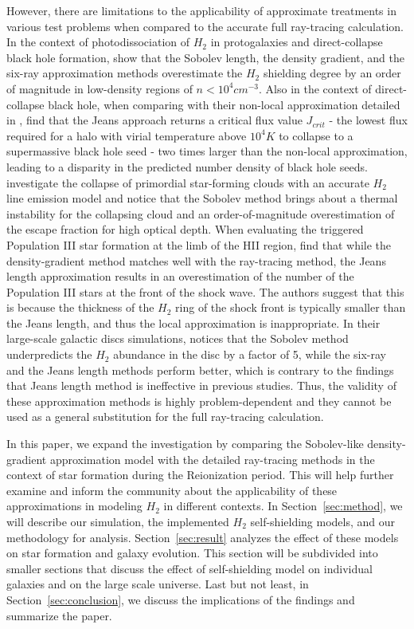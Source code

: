 \documentclass[linenumbers, twocolumn]{aastex631}
\begin{document}
However, there are limitations to the applicability of approximate treatments in various test problems when compared to the accurate full ray-tracing calculation. In the context of photodissociation of $H_{2}$ in protogalaxies and direct-collapse black hole formation, \cite{Wolcott-Green+2011} show that the Sobolev length, the density gradient, and the six-ray approximation methods overestimate the $H_{2}$ shielding degree by an order of magnitude in low-density regions of $n < 10^{4} cm^{-3}$. Also in the context of direct-collapse black hole, when comparing with their non-local approximation detailed in \cite{Hartwig+2015}, \cite{Hartwig+2015b} find that the Jeans approach returns a critical flux value $J_{crit}$ - the lowest flux required for a halo with virial temperature above $10^{4} K$ to collapse to a supermassive black hole seed - two times larger than the non-local approximation, leading to a disparity in the predicted number density of black hole seeds. \cite{Greif+2014} investigate the collapse of primordial star-forming clouds with an accurate $H_{2}$ line emission model and notice that the Sobolev method brings about a thermal instability for the collapsing cloud and an order-of-magnitude overestimation of the escape fraction for high optical depth. When evaluating the triggered Population III star formation at the limb of the HII region, \cite{Chiaki+2023a} find that while the density-gradient method matches well with the ray-tracing method, the Jeans length approximation results in an overestimation of the number of the Population III stars at the front of the shock wave. The authors suggest that this is because the thickness of the $H_{2}$ ring of the shock front is typically smaller than the Jeans length, and thus the local approximation is inappropriate. In their large-scale galactic discs simulations, \cite{Safranek-Shrader+2017} notices that the Sobolev method underpredicts the $H_{2}$ abundance in the disc by a factor of 5, while the six-ray and the Jeans length methods perform better, which is contrary to the findings that Jeans length method is ineffective in previous studies. Thus, the validity of these approximation methods is highly problem-dependent and they cannot be used as a general substitution for the full ray-tracing calculation. 

In this paper, we expand the investigation by comparing the Sobolev-like density-gradient approximation model \citep{Gnedin+2009} with the detailed ray-tracing methods in the context of star formation during the Reionization period. This will help further examine and inform the community about the applicability of these approximations in modeling $H_{2}$ in different contexts. In Section~\ref{sec:method}, we will describe our simulation, the implemented $H_{2}$ self-shielding models, and our methodology for analysis. Section~\ref{sec:result} analyzes the effect of these models on star formation and galaxy evolution. This section will be subdivided into smaller sections that discuss the effect of self-shielding model on individual galaxies and on the large scale universe. Last but not least, in Section~\ref{sec:conclusion}, we discuss the implications of the findings and summarize the paper. \\
\end{document}
